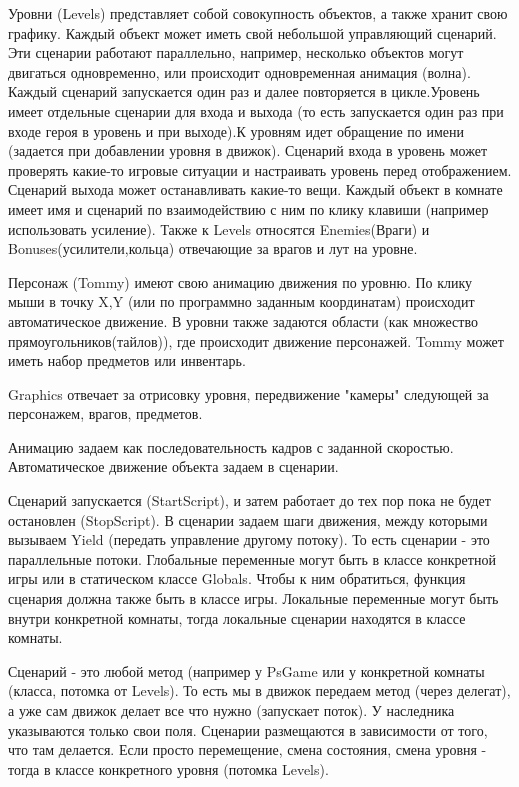 Уровни (Levels) представляет собой совокупность объектов, а также хранит свою графику. Каждый объект может иметь свой небольшой управляющий сценарий. Эти сценарии работают параллельно, например, несколько объектов могут двигаться одновременно, или происходит одновременная анимация (волна). Каждый сценарий запускается один раз и далее повторяется в цикле.Уровень имеет отдельные сценарии для входа и выхода (то есть запускается один раз при входе героя в уровень и при выходе).К уровням идет обращение по имени (задается при добавлении уровня в движок).
Сценарий входа в уровень может проверять какие-то игровые ситуации и настраивать уровень перед отображением. Сценарий выхода может останавливать какие-то вещи.
Каждый объект в комнате имеет имя и сценарий по взаимодействию с ним по клику клавиши (например использовать усиление).
Также к Levels относятся Enemies(Враги) и Bonuses(усилители,кольца) отвечающие за врагов и лут на уровне.

Персонаж (Tommy) имеют свою анимацию движения по уровню. По клику мыши в точку X,Y (или по программно заданным координатам) происходит автоматическое движение.
В уровни также задаются области (как множество прямоугольников(тайлов)), где происходит движение персонажей.
Tommy может иметь набор предметов или инвентарь.

Graphics отвечает за отрисовку уровня, передвижение "камеры" следующей за персонажем, врагов, предметов.

Анимацию задаем как последовательность кадров с заданной скоростью.
Автоматическое движение объекта задаем в сценарии.

Сценарий запускается (StartScript), и затем работает до тех пор пока не будет остановлен (StopScript).
В сценарии задаем шаги движения, между которыми вызываем Yield (передать управление другому потоку). То есть сценарии - это параллельные потоки.
Глобальные переменные могут быть в классе конкретной игры или в статическом классе Globals. Чтобы к ним обратиться, функция сценария должна также быть в классе игры. Локальные переменные могут быть внутри конкретной комнаты, тогда локальные сценарии находятся в классе комнаты.

Сценарий - это любой метод (например у PsGame или у конкретной комнаты (класса, потомка от Levels).
То есть мы в движок передаем метод (через делегат), а уже сам движок делает все что нужно (запускает поток).
У наследника указываются только свои поля. Сценарии размещаются в зависимости от того, что там делается.
Если просто перемещение, смена состояния, смена уровня - тогда в классе конкретного уровня (потомка Levels).

